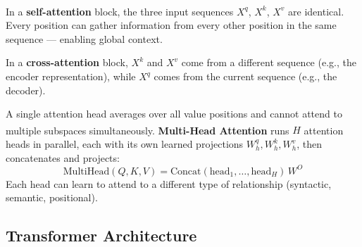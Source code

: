 \begin{tcbitemize}[ skin=sectionraster ]
    \tcbitem[title={Self- and Cross-Attention}, raster multicolumn=3]
    In a \textbf{self-attention} block, the three input sequences $X^q$, $X^k$, $X^v$ are identical\textsuperscript{\cite[][p.~79]{fleuretLittleBookDeep}}.
    Every position can gather information from every other position in the same sequence --- enabling global context.

    In a \textbf{cross-attention} block, $X^k$ and $X^v$ come from a different sequence (e.g., the encoder representation), while $X^q$ comes from the current sequence (e.g., the decoder).

    \tcbitem[title={Multi-Head Attention}, raster multicolumn=3]
    A single attention head averages over all value positions and cannot attend to multiple subspaces simultaneously.
    \textbf{Multi-Head Attention}\textsuperscript{\cite[][pp.~4--5]{vaswaniAttentionAllYou2023}} runs $H$ attention heads in parallel, each with its own learned projections $W^q_h, W^k_h, W^v_h$, then concatenates and projects:
    \begin{equation}
        \mathrm{MultiHead}(Q,K,V) = \mathrm{Concat}(\mathrm{head}_1,\ldots,\mathrm{head}_H)\,W^O
    \end{equation}
    Each head can learn to attend to a different type of relationship (syntactic, semantic, positional).
\end{tcbitemize}

\subsection{Transformer Architecture}

